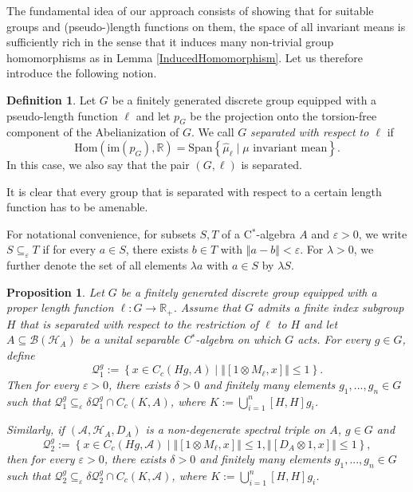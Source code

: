 \documentclass[a4paper,11pt,reqno]{amsart}
\numberwithin{equation}{section}
\numberwithin{equation}{section}
\newtheorem{proposition}[theorem]{Proposition}
\theoremstyle{definition}
\newtheorem{definition}[theorem]{Definition}
\theoremstyle{remark}
\theoremstyle{remark}
\begin{document}
The fundamental idea of our approach consists of showing that for
suitable groups and (pseudo-)length functions on them, the space of
all invariant means is sufficiently rich in the sense that it induces
many non-trivial group homomorphisms as in Lemma \ref{InducedHomomorphism}.
Let us therefore introduce the following notion.

\begin{definition} \label{SeparatedDefinition} Let $G$ be a finitely
generated discrete group equipped with a pseudo-length function $\ell$
and let $p_{G}$ be the projection onto the torsion-free component
of the Abelianization of $G$. We call $G$ \emph{separated with respect
to $\ell$} if 
\[
\text{Hom}(\text{im}(p_{G}),\mathbb{R})=\text{Span}\left\{ \widehat{\mu}_{\ell}\mid\mu\text{ invariant mean}\right\} .
\]
In this case, we also say that the pair $(G,\ell)$ is separated. \end{definition}

It is clear that every group that is separated with respect to a certain
length function has to be amenable.

For notational convenience, for subsets $S,T$ of a C$^{\ast}$-algebra
$A$ and $\varepsilon>0$, we write $S\subseteq_{\varepsilon}T$ if
for every $a\in S$, there exists $b\in T$ with $\left\Vert a-b\right\Vert <\varepsilon$.
For $\lambda>0$, we further denote the set of all elements $\lambda a$
with $a\in S$ by $\lambda S$.

\begin{proposition} \label{DiagonalApproximation} Let $G$ be a
finitely generated discrete group equipped with a proper length function
$\ell:G\rightarrow\mathbb{R}_{+}$. Assume that $G$ admits a finite
index subgroup $H$ that is separated with respect to the restriction
of $\ell$ to $H$ and let $A\subseteq\mathcal{B}(\mathcal{H}_{A})$
be a unital separable C$^{\ast}$-algebra on which $G$ acts. For
every $g\in G$, define 
\[
\mathcal{Q}_{1}^{g}:=\left\{ x\in C_{c}(Hg,A)\mid\left\Vert [1\otimes M_{\ell},x]\right\Vert \leq1\right\}.
\]
Then for every $\varepsilon>0$, there exists $\delta>0$ and finitely
many elements $g_{1},...,g_{n}\in G$ such that $\mathcal{Q}_{1}^{g}\subseteq_{\varepsilon}\delta\mathcal{Q}_{1}^{g}\cap C_{c}(K,A)$,
where $K:=\bigcup_{i=1}^{n}[H,H]g_{i}$.

Similarly, if $(\mathcal{A},\mathcal{H}_{A},D_{A})$ is a non-degenerate
spectral triple on $A$, $g\in G$ and 
\[
\mathcal{Q}_{2}^{g}:=\left\{ x\in C_{c}(Hg,\mathcal{A})\mid\left\Vert [1\otimes M_{\ell},x]\right\Vert \leq1,\left\Vert [D_{A}\otimes1,x]\right\Vert \leq1\right\} ,
\]
then for every $\varepsilon>0$, there exists $\delta>0$ and finitely
many elements $g_{1},...,g_{n}\in G$ such that $\mathcal{Q}_{2}^{g}\subseteq_{\varepsilon}\delta\mathcal{Q}_{2}^{g}\cap C_{c}(K,\mathcal{A})$,
where $K:=\bigcup_{i=1}^{n}[H,H]g_{i}$. \end{proposition}
\end{document}
